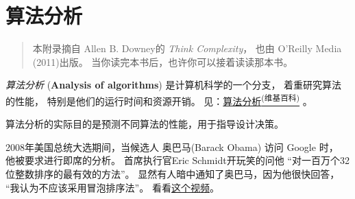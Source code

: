 

\chapter{算法分析}
\label{algorithms}


\begin{quote}
本附录摘自 Allen B. Downey的 {\em Think Complexity}， 也由 O’Reilly Media (2011)出版。 当你读完本书后，也许你可以接着读读那本书。
\end{quote}


{\em 算法分析} ({\bf Analysis of algorithms}) 是计算机科学的一个分支，
 着重研究算法的性能， 特别是他们的运行时间和资源开销。
见：\href{http://en.wikipedia.org/wiki/Analysis_of_algorithms}{算法分析\textsuperscript{(维基百科)}} 。

 


算法分析的实际目的是预测不同算法的性能，用于指导设计决策。


2008年美国总统大选期间，当候选人 奥巴马(Barack Obama) 访问 Google 时，
他被要求进行即席的分析。  首席执行官Eric Schmidt开玩笑的问他
``对一百万个32位整数排序的最有效的方法''。
显然有人暗中通知了奥巴马，因为他很快回答， ``我认为不应该采用冒泡排序法''。
看看\href{http://www.youtube.com/watch?v=k4RRi_ntQc8}{这个视频}。

